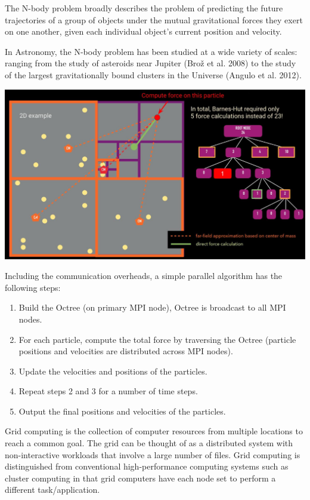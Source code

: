 \begin{minipage}{0.48\textwidth}
    The N-body problem broadly
    describes the problem of
    predicting the future
    trajectories of a group of
    objects under the mutual
    gravitational forces they exert
    on one another, given each
    individual object's current
    position and velocity.

    In Astronomy, the N-body
    problem has been studied at a
    wide variety of scales: ranging
    from the study of asteroids
    near Jupiter (Brož et al. 2008)
    to the study of the largest
    gravitationally bound clusters
    in the Universe (Angulo et al.
    2012).
\end{minipage}
\hfill
\begin{minipage}{0.48\textwidth}
    \centering
    \includegraphics[width=\textwidth]{assets/fig6.png}
\end{minipage}

\newpage 
Including the communication overheads, a simple parallel algorithm has the
following steps:
\begin{enumerate}
    \item Build the Octree (on primary MPI node), Octree is broadcast to all MPI nodes.
    \item For each particle, compute the total force by traversing the Octree (particle positions and velocities are distributed across MPI nodes).
    \item Update the velocities and positions of the particles.
    \item Repeat steps 2 and 3 for a number of time steps.
    \item Output the final positions and velocities of the particles.
\end{enumerate}

\begin{definitionblock}
    Grid computing is the collection of computer resources from multiple locations to reach a common goal. The grid can be thought of as a distributed system with non-interactive workloads that involve a large number of files. Grid computing is distinguished from conventional high-performance computing systems such as cluster computing in that grid computers have each node set to perform a different task/application.
\end{definitionblock}

